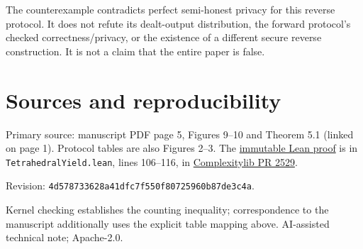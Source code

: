 \documentclass[10pt,a4paper]{article}
\begin{document}
The counterexample contradicts perfect semi-honest privacy for this reverse protocol. It does not refute its dealt-output distribution, the forward protocol's checked correctness/privacy, or the existence of a different secure reverse construction. It is not a claim that the entire paper is false.
\section*{Sources and reproducibility}
\small
Primary source: manuscript PDF page 5, Figures 9--10 and Theorem 5.1 (linked on page 1). Protocol tables are also Figures 2--3. The \href{https://github.com/cslib-community/complexitylib/blob/4d578733628a41dfc7f550f80725960b87de3c4a/Complexity/Crypto/Multiparty/TetrahedralYield.lean#L106}{immutable Lean proof} is in \texttt{TetrahedralYield.lean}, lines 106--116, in \href{https://github.com/cslib-community/complexitylib/pull/2529}{Complexitylib PR 2529}.

Revision: \texttt{4d578733628a41dfc7f550f80725960b87de3c4a}.

Kernel checking establishes the counting inequality; correspondence to the manuscript additionally uses the explicit table mapping above. AI-assisted technical note; Apache-2.0.
\end{document}
